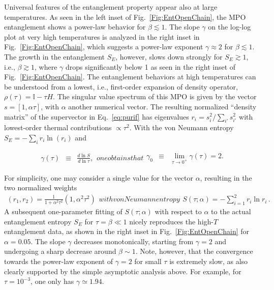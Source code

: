 \documentclass[aps,prx,twocolumn,showpacs,psfig,superscriptaddress,longbibliography]{revtex4-1}
\newcommand{\Eq}[1]{Eq.~\eqref{#1}}
\newcommand{\Fig}[1]{Fig.~\ref{#1}}
\begin{document}
Universal features of the entanglement property appear also at large
temperatures.  As seen in the left inset of \Fig{Fig:EntOpenChain},
the MPO entanglement shows a power-law behavior for $\beta \lesssim
1$.  The slope $\gamma$ on the log-log plot at very high
temperatures is analyzed in the right inset in
\Fig{Fig:EntOpenChain}, which suggests a power-law exponent $\gamma
\approx 2$ for $\beta \lesssim 1$. The growth in the entanglement
$S_E$, however, slows down strongly for $S_E\gtrsim1$, i.e., $\beta
\gtrsim 1$, where $\gamma$ drops significantly below 1 as seen in
the right inset of \Fig{Fig:EntOpenChain}.  The entanglement
behaviors at high temperatures can be understood from a lowest,
i.e., first-order expansion of density operator, $\rho(\tau) =
\mathbb{I} - \tau H$.  The singular value spectrum of this MPO is
given by the vector $s=[1,\alpha\tau]$, with $\alpha$ another
numerical vector. The resulting normalized ``density matrix'' of the
supervector in \Eq{eq:purif} has eigenvalues $r_i=s_i^2/\sum_{i'}
s_{i'}^2$ with lowest-order thermal contributions $\propto \tau^2$.
With the von Neumann entropy $S_E=-\sum_i r_i \ln(r_i)$ and

\begin{subequations} \label{eq:gamma}
\begin{eqnarray}
   \gamma(\tau) &\equiv& \tfrac{d \ln S}{d \ln\tau},
\end{eqnarray}
one obtains that
\begin{eqnarray}
   \gamma_0 &\equiv& \lim_{\tau\to 0^+} \gamma(\tau) =2.
\end{eqnarray}
\end{subequations}

For simplicity, one may consider a single value for the
vector $\alpha$, resulting in the two normalized weights
%
\begin{subequations}\label{eq:fit:SE}
\begin{eqnarray}
  (r_1,r_2) = \tfrac{1}{1+{\alpha}^2\tau^2} ( 1, {\alpha}^2 \tau^2 )
\end{eqnarray}
with von Neumann entropy
\begin{eqnarray}
  S(\tau; \alpha) = -\sum_{i=1}^2 r_i \ln r_i 
\,\text{.}
\end{eqnarray}
\end{subequations}
%
A subsequent one-parameter fitting of $S(\tau;\alpha)$ with respect
to $\alpha$ to the actual entanglement entropy $S_E$ for
$\tau=\beta\ll 1$ nicely reproduces the high-$T$ entanglement data,
as shown in the right inset in \Fig{Fig:EntOpenChain} for
$\alpha=0.05$.  The slope $\gamma$ decreases  {monotonically}, starting
from $\gamma=2$ and undergoing a sharp decrease around $\beta\sim1$.
Note, however, that the convergence towards the power-law exponent
of $\gamma=2$ for small $\tau$ is extremely slow, as also clearly
supported by the simple asymptotic analysis above. For example, for
$\tau=10^{-3}$, one only has $\gamma \simeq 1.94$.
\end{document}
